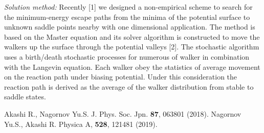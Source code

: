 \documentclass[preprint,12pt]{elsarticle}
\begin{document}
\begin{small}
\noindent
{\em Solution method:}
Recently [1] we designed a non-empirical scheme to search for the minimum-energy escape paths from the minima of the potential surface to unknown saddle points nearby with one dimensional application. The method is based on the Master equation and its solver algorithm is constructed to move the walkers up the surface through the potential valleys [2]. The stochastic algorithm uses a birth/death stochastic processes for numerous of walker in combination with the Langevin equation. Each walker obey the statistics of average movement on the reaction path under biasing potential. Under this consideration the reaction path is derived as the average of the walker distribution from stable to saddle states.



\begin{thebibliography}{2}
Akashi R., Nagornov Yu.S. J. Phys. Soc. Jpn. \textbf{87}, 063801 (2018).        %
 Nagornov Yu.S., Akashi R. Physica A, \textbf{528}, 121481 (2019).         %
\end{thebibliography}
\end{small}

\newpage






\end{document}
